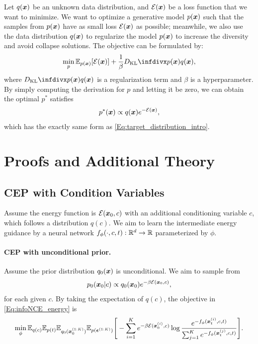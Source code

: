 Let $q({\bm{x}})$ be an unknown data distribution, and ${\mathcal{E}}({\bm{x}})$ be a loss function that we want to minimize. We want to optimize a generative model $p({\bm{x}})$ such that the samples from $p({\bm{x}})$ have as small loss ${\mathcal{E}}({\bm{x}})$ as possible; meanwhile, we also use the data distribution $q({\bm{x}})$ to regularize the model $p({\bm{x}})$ to increase the diversity and avoid collapse solutions. The objective can be formulated by:
\begin{equation}
\min_{p} \E_{p(\x)} [\gE(\x)]
     + \frac{1}{\beta} \kl{p(\x)}{q(\x)},
\end{equation}
where $\kl{p(\x)}{q(\x)}$ is a regularization term and $\beta$ is a hyperparameter. By simply computing the derivation for $p$ and letting it be zero, we can obtain the optimal $p^*$ satisfies
\begin{equation}
    p^*({\bm{x}}) \propto q({\bm{x}})e^{-{\mathcal{E}}({\bm{x}})},
\end{equation}
which has the exactly same form as \eqref{Eq:target_distribution_intro}.




\section{Proofs and Additional Theory}
\label{appendix:proof}



\subsection{CEP with Condition Variables}
Assume the energy function is ${\mathcal{E}}({\bm{x}}_0,c)$ with an additional conditioning variable $c$, which follows a distribution $q(c)$. We aim to learn the intermediate energy guidance by a neural network $f_\phi(\cdot,c,t):\mathbb{R}^d\rightarrow \mathbb{R}$ parameterized by $\phi$.

\paragraph{CEP with unconditional prior.}
Assume the prior distribution $q_0({\bm{x}})$ is unconditional. We aim to sample from 
\begin{equation}
    p_0({\bm{x}}_0|c) \propto q_0({\bm{x}}_0)e^{-\beta{\mathcal{E}}({\bm{x}}_0,c)},
\end{equation}
for each given $c$.
By taking the expectation of $q(c)$, the objective in \eqref{Eq:infoNCE_energy} is
\begin{equation}
\min_\phi \mathbb{E}_{q(c)}\mathbb{E}_{p(t)}\mathbb{E}_{q_0({\bm{x}}_0^{(1:K)})}\mathbb{E}_{p(\bm{\epsilon}^{(1:K)})}\Bigg[
    - \sum_{i=1}^K
     e^{-\beta{\mathcal{E}}({\bm{x}}_0^{(i)}, c)}
    \log \frac{e^{-f_\phi({\bm{x}}_t^{(i)},c,t)}}{\sum_{j=1}^K e^{-f_\phi({\bm{x}}_t^{(j)},c,t)}}
\Bigg].
\end{equation}

